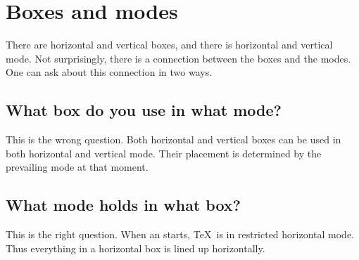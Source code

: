 \documentclass{book}
\begin{document}
\section{Boxes and modes}
\label{hvbox}

There are horizontal and vertical boxes, and there is
horizontal and vertical mode. Not surprisingly, there is
a connection between the boxes and the modes.
One can ask about this connection in two ways.

\subsection{What box do you use in what mode?}

This is the wrong question. Both horizontal  and vertical boxes
can be used in both horizontal and vertical mode. 
Their placement is determined by the prevailing mode at that moment.

\subsection{What mode holds in what box?}

This is the right question.
When an  starts, \TeX\ is in restricted horizontal
mode. Thus everything in a horizontal box is lined up horizontally.
\end{document}
